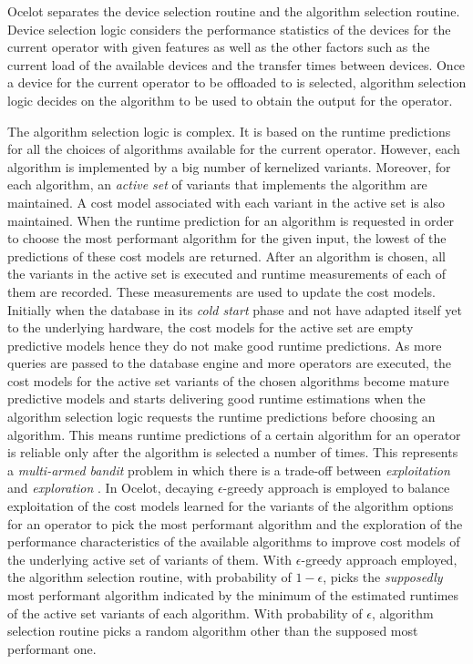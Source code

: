 Ocelot separates the device selection routine and the algorithm selection routine. Device selection logic considers the performance statistics of the devices for the current operator with given features as well as the other factors such as the current load of the available devices and the transfer times between devices. Once a device for the current operator to be offloaded to is selected, algorithm selection logic decides on the algorithm to be used to obtain the output for the operator. 

The algorithm selection logic is complex. It is based on the runtime predictions for all the choices of algorithms available for the current operator. However, each algorithm is implemented by a big number of kernelized variants. Moreover, for each algorithm, an \textit{active set} of variants that implements the algorithm are maintained. A cost model associated with each variant in the active set is also maintained. When the runtime prediction for an algorithm is requested in order to choose the most performant algorithm for the given input, the lowest of the predictions of these cost models are returned. After an algorithm is chosen, all the variants in the active set is executed and runtime measurements of each of them are recorded. These measurements are used to update the cost models. Initially when the database in its \textit{cold start} phase and not have adapted itself yet to the underlying hardware, the cost models for the active set are empty predictive models hence they do not make good runtime predictions. As more queries are passed to the database engine and more operators are executed, the cost models for the active set variants of the chosen algorithms become mature predictive models and starts delivering good runtime estimations when the algorithm selection logic requests the runtime predictions before choosing an algorithm. This means runtime predictions of a certain algorithm for an operator is reliable only after the algorithm is selected a number of times. This represents a \textit{multi-armed bandit} problem in which there is a trade-off between \textit{exploitation} and \textit{exploration} \citep[p. 618]{heimel_demonstrating_2014}. In Ocelot, decaying $\epsilon$-greedy approach is employed to balance exploitation of the cost models learned for the variants of the algorithm options for an operator to pick the most performant algorithm and the exploration of the performance characteristics of the available algorithms to improve cost models of the underlying active set of variants of them. With $\epsilon$-greedy approach employed, the algorithm selection routine, with probability of $1-\epsilon$, picks the \textit{supposedly} most performant algorithm indicated by the minimum of the estimated runtimes of the active set variants of each algorithm. With probability of $\epsilon$, algorithm selection routine picks a random algorithm other than the supposed most performant one.

